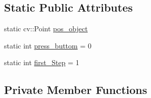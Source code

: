 \subsection*{Static Public Attributes}
\begin{DoxyCompactItemize}
\item 
static cv\-::\-Point \hyperlink{classCamera_a3c133f08d9bc8154927d9105984f2ce9}{pos\-\_\-object}
\item 
static int \hyperlink{classCamera_a17309254cbc79d0b0e8eb569d70131f6}{press\-\_\-buttom} = 0
\item 
static int \hyperlink{classCamera_a5cb30974eb6e3f4e9297dd1dad35c1de}{first\-\_\-\-Step} = 1
\end{DoxyCompactItemize}
\subsection*{Private Member Functions}
